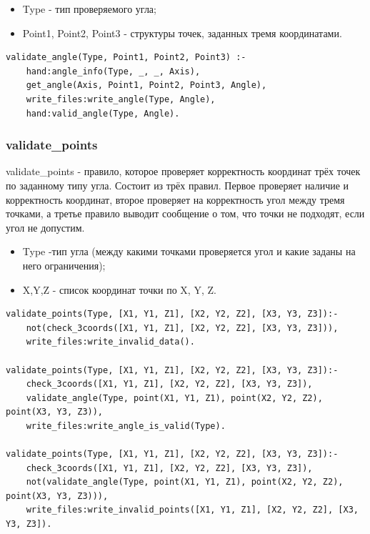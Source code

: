 \begin{itemize}
	\item Type - тип проверяемого угла;
	\item Point1, Point2, Point3 - структуры точек, заданных тремя координатами.
\end{itemize}

\begin{lstlisting}[caption=Реализация правила validate\_angle, label=rules:validateangle]
validate_angle(Type, Point1, Point2, Point3) :-
	hand:angle_info(Type, _, _, Axis),
	get_angle(Axis, Point1, Point2, Point3, Angle),
	write_files:write_angle(Type, Angle),
	hand:valid_angle(Type, Angle).
\end{lstlisting}

\subsubsection{validate\_points}
\hspace{0.6cm} validate\_points - правило, которое проверяет корректность координат трёх точек по заданному типу угла. Состоит из трёх правил. Первое проверяет наличие и корректность координат, второе проверяет на корректность угол между тремя точками, а третье правило выводит сообщение о том, что точки не подходят, если угол не допустим.

\begin{itemize}
	\item Type -тип угла (между какими точками проверяется угол и какие заданы на него ограничения);
	\item X,Y,Z - список координат точки по X, Y, Z.
\end{itemize}

\begin{lstlisting}[caption=Реализация правила validate\_points, label=rules:validatepoints]
validate_points(Type, [X1, Y1, Z1], [X2, Y2, Z2], [X3, Y3, Z3]):-
	not(check_3coords([X1, Y1, Z1], [X2, Y2, Z2], [X3, Y3, Z3])),
	write_files:write_invalid_data().

validate_points(Type, [X1, Y1, Z1], [X2, Y2, Z2], [X3, Y3, Z3]):-
	check_3coords([X1, Y1, Z1], [X2, Y2, Z2], [X3, Y3, Z3]),
	validate_angle(Type, point(X1, Y1, Z1), point(X2, Y2, Z2), point(X3, Y3, Z3)),
	write_files:write_angle_is_valid(Type).
	
validate_points(Type, [X1, Y1, Z1], [X2, Y2, Z2], [X3, Y3, Z3]):-
	check_3coords([X1, Y1, Z1], [X2, Y2, Z2], [X3, Y3, Z3]),
	not(validate_angle(Type, point(X1, Y1, Z1), point(X2, Y2, Z2), point(X3, Y3, Z3))),
	write_files:write_invalid_points([X1, Y1, Z1], [X2, Y2, Z2], [X3, Y3, Z3]).
\end{lstlisting}

